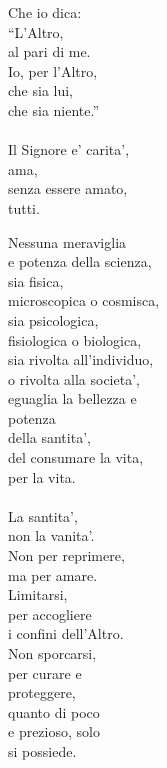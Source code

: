 \begin{haiku}
    Che io dica: \\
    ``L'Altro,\\
    al pari di me.\\
    Io, per l'Altro,\\
    che sia lui,\\
    che sia niente.''\\
    \leavevmode\\
    Il Signore e' carita',\\
    ama, \\
    senza essere amato,\\
    tutti.\\
\end{haiku}


\begin{haiku}
    Nessuna meraviglia\\
    e potenza della scienza,\\
    sia fisica, \\
    microscopica o cosmisca,\\
    sia psicologica,\\
    fisiologica o biologica,\\
    sia rivolta all'individuo, \\
    o rivolta alla societa',\\
    eguaglia la bellezza e\\
    potenza\\
    della santita',\\
    del consumare la vita,\\
    per la vita.\\
    \leavevmode\\
    La santita',\\
    non la vanita'.\\
    Non per reprimere,\\
    ma per amare.\\
    Limitarsi, \\
    per accogliere \\
    i confini dell'Altro.\\
    Non sporcarsi,\\
    per curare e\\
    proteggere,\\
    quanto di poco\\
    e prezioso, solo\\
    si possiede.\\
\end{haiku}

